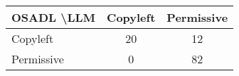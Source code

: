 \begin{tabular}{l|cc}\hline
	\textbf{OSADL \textbackslash LLM} & Copyleft & Permissive\\\hline
	Copyleft & 20 & 12\\
	Permissive & 0 & 82\\\hline
\end{tabular}

